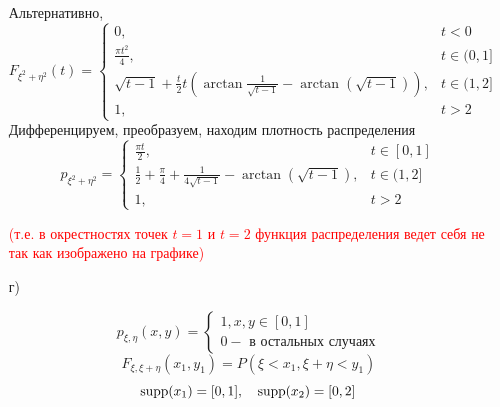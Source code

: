 \begin{exmp}
\begin{enumerate}
		Альтернативно,
		\[
		F_{\xi^2 + \eta^2} (t) =
		\begin{cases}
			0, &t < 0 \\
			\frac{\pi t^2}{4}, &t \in (0, 1] \\
			\sqrt{t-1} + \frac{t}{2} t \left( \arctan \frac{1}{\sqrt{t-1}} - \arctan (\sqrt{t-1}) \right), &t \in (1, 2] \\
			1, &t > 2
		\end{cases}
		\]
		Дифференцируем, преобразуем, находим плотность распределения
		\[
		p_{\xi^2 + \eta^2} =
		\begin{cases}
			\frac{\pi t}{2}, &t \in [0,1] \\
			\frac{1}{2} + \frac{\pi}{4} + \frac{1}{4 \sqrt{t-1}} - \arctan (\sqrt{t-1}), &t \in (1,2] \\
			1, &t > 2
		\end{cases}
		\]
		
		\textcolor{red}{(т.е. в окрестностях точек $t = 1$ и $t = 2$ функция распределения ведет себя не так как изображено
			на графике)}
		
		\item[г)]
		
		\[
		p_{\xi, \eta} (x, y) =
		\begin{cases}
			1, x, y \in [0, 1] \\
			0 - \text{ в остальных случаях}
		\end{cases}
		\]
		\[
		F_{\xi, \xi + \eta} (x_1, y_1) = P(\xi < x_1, \xi + \eta < y_1)
		\]
		\[
		\operatorname{supp} (x_1) = [0,1], ~~~ \operatorname{supp} (x_2) = [0,2]
		\]
		\begin{figure}[H]
		\end{figure}
		

\end{enumerate}
\end{exmp}
